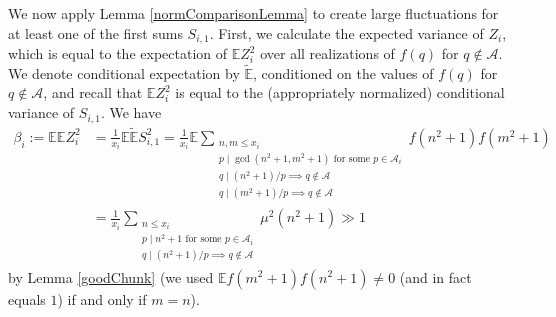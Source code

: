 \documentclass[11pts]{amsart}
\numberwithin{equation}{section}
\begin{document}
We now apply Lemma \ref{normComparisonLemma} to create large fluctuations for at least one of the first sums $S_{i,1}$. First, we calculate the expected variance of $Z_i$, which is equal to the expectation of $\mathbb EZ_i^2$ over all realizations of $f(q)$ for $q\not\in\mathcal A$. We denote conditional expectation by $\widetilde{\mathbb E}$, conditioned on the values of $f(q)$ for $q\not\in\mathcal A$, and recall that $\mathbb EZ_i^2$ is equal to the (appropriately normalized) conditional variance of $S_{i, 1}$.  We have
\begin{align}
   \beta_i := \mathbb E\mathbb EZ_i^2  & = \frac{1}{x_i}\mathbb E\widetilde{\mathbb E} S_{i,1}^2 = \frac{1}{x_i}\mathbb E \sum_{\substack{n, m\leq x_i \\ p\mid \gcd(n^2 + 1, m^2 + 1) \text{ for some } p\in \mathcal A_i \\ q\mid (n^2 + 1)/p\implies q\not\in\mathcal A \\ q\mid (m^2 + 1)/p\implies q\not\in\mathcal A}} f(n^2+1)f(m^2 + 1) \\ & = \frac{1}{x_i}\sum_{\substack{n\leq x_i \\ p\mid n^2 + 1 \text{ for some } p\in\mathcal A_i \\ q\mid (n^2 + 1)/p \implies q\not\in \mathcal A}} \mu^2(n^2 + 1)
\gg 1 \end{align} by Lemma \ref{goodChunk} (we used $\mathbb Ef(m^2 + 1)f(n^2 + 1) \neq 0$ (and in fact equals $1$) if and only if $m=n$). 
\end{document}
